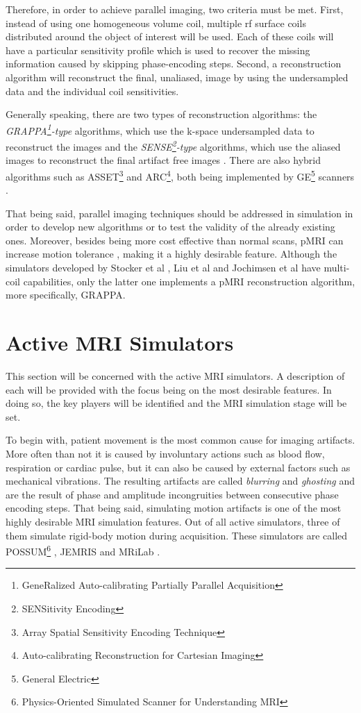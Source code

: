 Therefore, in order to achieve parallel imaging, two criteria must be met. First, instead of using one homogeneous volume coil, multiple rf surface coils distributed around the object of interest will be used. Each of these coils will have a particular sensitivity profile which is used to recover the missing information caused by skipping phase-encoding steps. Second, a reconstruction algorithm will reconstruct the final, unaliased, image by using the undersampled data and the individual coil sensitivities. 

Generally speaking, there are two types of reconstruction algorithms: the \textit{GRAPPA\footnote{GeneRalized Auto-calibrating Partially Parallel
Acquisition}-type} algorithms, which use the k-space undersampled data to reconstruct the images and the \textit{SENSE\footnote{SENSitivity Encoding}-type} algorithms, which use the aliased images to reconstruct the final artifact free images \cite{Deshmane2012}. There are also hybrid algorithms such as ASSET\footnote{Array Spatial Sensitivity Encoding Technique} and ARC\footnote{Auto-calibrating Reconstruction for Cartesian
Imaging}, both being implemented by GE\footnote{General Electric} scanners \cite{Yanasak2015}.

That being said, parallel imaging techniques should be addressed in simulation in order to develop new algorithms or to test the validity of the already existing ones. Moreover, besides being more cost effective than normal scans, pMRI can increase motion tolerance \cite{Yanasak2014}, making it a highly desirable feature. Although the simulators developed by Stocker et al \cite{Stocker2010}, Liu et al \cite{Liu2013} and Jochimsen et al \cite{Jochimsen2004} have multi-coil capabilities, only the latter one implements a pMRI reconstruction algorithm, more specifically, GRAPPA.

\section{Active MRI Simulators}
This section will be concerned with the active MRI simulators. A description of each will be provided with the focus being on the most desirable features. In doing so, the key players will be identified and the MRI simulation stage will be set.

To begin with, patient movement is the most common cause for imaging artifacts. More often than not it is caused by involuntary actions such as blood flow, respiration or cardiac pulse, but it can also be caused by external factors such as mechanical vibrations. The resulting artifacts are called \textit{blurring} and \textit{ghosting} and are the result of phase and amplitude incongruities \cite{Pusey1986} between consecutive phase encoding steps. That being said, simulating motion artifacts is one of the most highly desirable MRI simulation features. Out of all active simulators, three of them simulate rigid-body motion during acquisition. These simulators are called POSSUM\footnote{Physics-Oriented Simulated Scanner for Understanding MRI} \cite{Drobnjak2006}, JEMRIS \cite{Stocker2010} and MRiLab \cite{Liu2013}.

